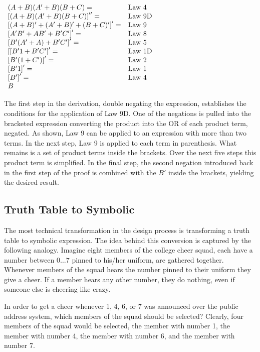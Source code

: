 $\begin{array}[ht]{ll}
(A+B)(A'+B)(B+C) = 			& {\rm Law\ 4} \\
\left[ (A+B)(A'+B)(B+C) \right] '' =& {\rm Law\ 9D} \\
\left[ (A+B)'+(A'+B)'+(B+C)' \right]' = & {\rm Law\ 9} \\
\left[ A'B'+AB'+B'C' \right]' = 	& {\rm Law\ 8} \\
\left[ B'(A'+A)+B'C' \right]' = 	& {\rm Law\ 5} \\
\left[ [B'1+ B'C' \right]' = 		& {\rm Law\ 1D} \\
\left[ B'(1+C') \right]' = 		& {\rm Law\ 2} \\
\left[ B'1 \right]' = 			& {\rm Law\ 1} \\
\left[ B' \right]' = 			& {\rm Law\ 4} \\
B  &  
\end{array}$

The first step in the derivation, double negating the expression, establishes 
the conditions for the application of Law 9D. One of the negations is
pulled into the bracketed expression converting the product into 
the OR of each product term, negated.  As shown, Law 9 can be applied
to an expression with more than two terms.  In the next step, Law 9 is 
applied to each term in parenthesis.  What remains is a set of product 
terms inside the brackets.  Over the next five steps this product term 
is simplified.  In the final step, the second negation introduced 
back in the first step of the proof is combined with the $B'$ 
inside the brackets, yielding the desired result.

\subsection{Truth Table to Symbolic}
\label{sec:TTtoSymb}

The most technical transformation in the design process is transforming 
a truth table to symbolic expression.  The idea behind this conversion is 
captured by the following analogy.  Imagine eight members of the college 
cheer squad, each have a number between $0 \ldots 7$ pinned to his/her
uniform, are gathered together.  Whenever members of the squad hears
the number pinned to their uniform they give a cheer.  If a member hears
any other number, they do nothing, even if someone else is cheering like crazy.

In order to get a cheer whenever 1, 4, 6, or 7 was announced 
over the public address system, which members of the squad should be
selected?  Clearly, four members of the squad would be selected, the member
with number 1, the member with number 4, the member with number 6,
and the member with number 7.

